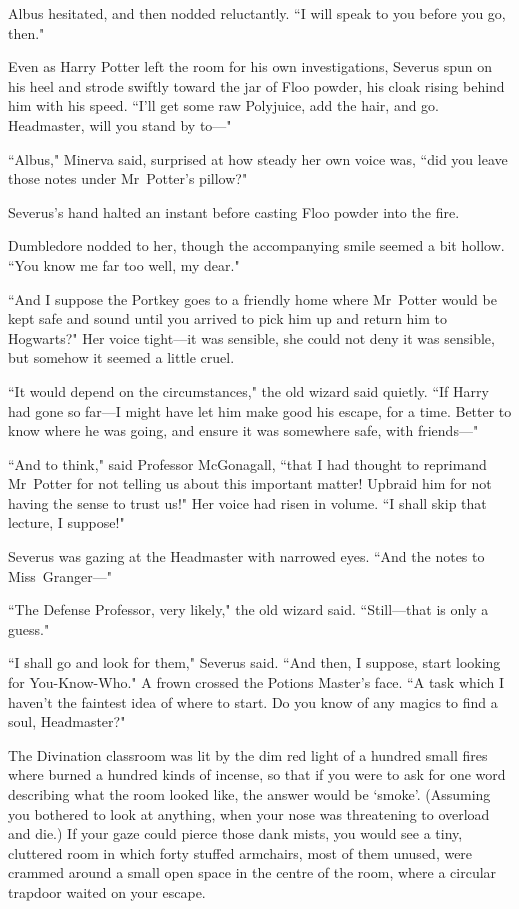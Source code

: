Albus hesitated, and then nodded reluctantly. ``I will speak to you before you go, then."

\later

Even as Harry Potter left the room for his own investigations, Severus spun on his heel and strode swiftly toward the jar of Floo powder, his cloak rising behind him with his speed. ``I'll get some raw Polyjuice, add the hair, and go. Headmaster, will you stand by to—"

``Albus," Minerva said, surprised at how steady her own voice was, ``did you leave those notes under Mr~Potter's pillow?"

Severus's hand halted an instant before casting Floo powder into the fire.

Dumbledore nodded to her, though the accompanying smile seemed a bit hollow. ``You know me far too well, my dear."

``And I suppose the Portkey goes to a friendly home where Mr~Potter would be kept safe and sound until you arrived to pick him up and return him to Hogwarts?" Her voice tight—it was sensible, she could not deny it was sensible, but somehow it seemed a little cruel.

``It would depend on the circumstances," the old wizard said quietly. ``If Harry had gone so far—I might have let him make good his escape, for a time. Better to know where he was going, and ensure it was somewhere safe, with friends—"

``And to think," said Professor McGonagall, ``that I had thought to reprimand Mr~Potter for not telling us about this important matter! Upbraid him for not having the sense to trust us!" Her voice had risen in volume. ``I shall skip that lecture, I suppose!"

Severus was gazing at the Headmaster with narrowed eyes. ``And the notes to Miss~Granger—"

``The Defense Professor, very likely," the old wizard said. ``Still—that is only a guess."

``I shall go and look for them," Severus said. ``And then, I suppose, start looking for You-Know-Who." A frown crossed the Potions Master's face. ``A task which I haven't the faintest idea of where to start. Do you know of any magics to find a soul, Headmaster?"

\later

The Divination classroom was lit by the dim red light of a hundred small fires where burned a hundred kinds of incense, so that if you were to ask for one word describing what the room looked like, the answer would be `smoke'. (Assuming you bothered to look at anything, when your nose was threatening to overload and die.) If your gaze could pierce those dank mists, you would see a tiny, cluttered room in which forty stuffed armchairs, most of them unused, were crammed around a small open space in the centre of the room, where a circular trapdoor waited on your escape.

